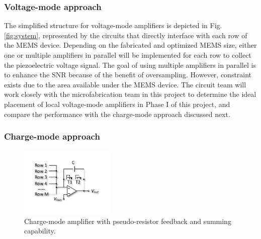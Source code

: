 \subsubsection{Voltage-mode approach}

The simplified structure for voltage-mode amplifiers is depicted in Fig. \ref{fig:system}, represented by the circuits that directly interface with each row of the MEMS device. Depending on the fabricated and optimized MEMS size, either one or multiple amplifiers in parallel will be implemented for each row to collect the piezoelectric voltage signal. The goal of using multiple amplifiers in parallel is to enhance the SNR because of the benefit of oversampling. However, constraint exists due to the area available under the MEMS device. The circuit team will work closely with the microfabrication team in this project to determine the ideal placement of local voltage-mode amplifiers in Phase I of this project, and compare the performance with the charge-mode approach discussed next.  

\subsubsection{Charge-mode approach}

\begin{figure}
\centering
\includegraphics[width=0.4\textwidth]{cmos}
\caption{Charge-mode amplifier with pseudo-resistor feedback and summing capability.}
\label{fig:cmos}
\end{figure}


